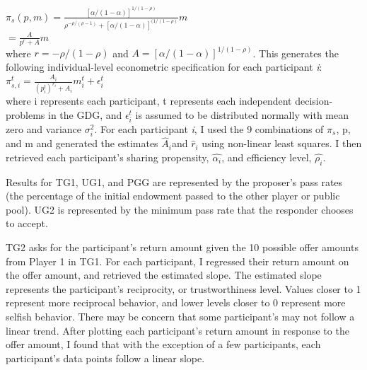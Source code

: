 \documentclass[12pt]{article}
\begin{document}
\(\pi_{s}(p,m)=\frac{[\alpha/(1-\alpha)]^{1/(1-\rho)}}{\rho^{-\rho/(\rho-1)}+[\alpha/(1-\alpha)]^{(1/(1-\rho)}}m\) \\

\hspace{13mm} \(= \frac{A}{p^{r}+A}m \) \\
 
 \noindent
where \(r=-\rho / (1-\rho) \) and \(A=[\alpha / (1-\alpha)]^{1/(1-\rho)} \). This generates the following individual-level econometric specification for each participant \textit{i}: \\
 
\( \pi^{t}_{s,i} = \frac{A_{i}}{(p^{t}_{i})^{r_{i}} + A_{i}}m^{t}_{i} + \epsilon^{t}_{i}\) \\
 
\noindent
where i represents each participant, t represents each independent decision-problems in the GDG, and \( \epsilon^{t}_{i} \) is assumed to be distributed normally with mean zero and variance \(\sigma^{2}_{i}\). For each participant \textit{i}, I used the 9 combinations of \(\pi_{s}\), p, and m and generated the estimates \( \hat{A}_{i} \)and \( \hat{r}_{i} \) using non-linear least squares. I then retrieved each participant's sharing propensity, \( \hat{\alpha_{i}} \), and efficiency level, \( \hat{\rho_{i}}\).

Results for TG1, UG1, and PGG are represented by the proposer\rq s pass rates (the percentage of the initial endowment passed to the other player or public pool). UG2 is represented by the minimum pass rate that the responder chooses to accept. 

TG2 asks for the participant\rq s return amount given the 10 possible offer amounts from Player 1 in TG1. For each participant, I regressed their return amount on the offer amount, and retrieved the estimated slope. The estimated slope represents the participant\rq s reciprocity, or trustworthiness level. Values closer to 1 represent more reciprocal behavior, and lower levels closer to 0 represent more selfish behavior. There may be concern that some participant\rq s may not follow a linear trend. After plotting each participant\rq s return amount in response to the offer amount, I found that with the exception of a few participants, each participant\rq s data points follow a linear slope.
\end{document}
